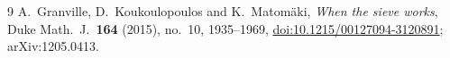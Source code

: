 \documentclass[11pt,a4paper]{amsart}
\theoremstyle{remark}
\begin{document}
\FloatBarrier
\begin{thebibliography}{9}
 A.~Granville, D.~Koukoulopoulos and K.~Matom\"aki, \emph{When the sieve works}, Duke
Math.\ J.\ \textbf{164} (2015), no.~10, 1935--1969,
\href{https://doi.org/10.1215/00127094-3120891}{doi:10.1215/00127094-3120891}; arXiv:1205.0413.
\end{thebibliography}
\end{document}
